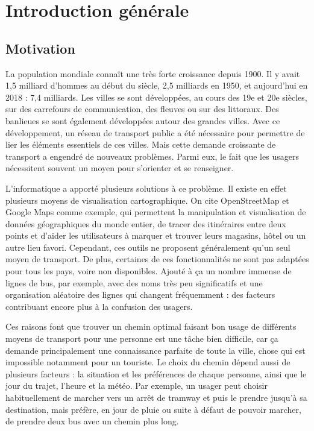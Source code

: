 \renewcommand\labelitemi{$\bullet$}
\renewcommand\labelitemii{$\circ$}
\chapter{Introduction générale}
\newpage	
\section{Motivation}
La population mondiale connaît une très forte croissance depuis 1900. Il y avait 1,5 milliard d’hommes au début du siècle, 2,5 milliards en 1950, et aujourd’hui en 2018 : 7,4 milliards. Les villes se sont développées, au cours des 19e et 20e siècles, sur des carrefours de communication, des fleuves ou sur des littoraux. Des banlieues se sont également développées autour des grandes villes. Avec ce développement, un réseau de transport public a été nécessaire pour permettre de lier les éléments essentiels de ces villes. Mais cette demande croissante de transport a engendré de nouveaux problèmes. Parmi eux, le fait que les usagers nécessitent souvent un moyen pour s’orienter et se renseigner.

L’informatique a apporté plusieurs solutions à ce problème. Il existe en effet plusieurs moyens de visualisation cartographique. On cite OpenStreetMap et Google Maps comme exemple, qui permettent la manipulation et visualisation de données géographiques du monde entier, de tracer des itinéraires entre deux points et d’aider les utilisateurs à marquer et trouver leurs magasins, hôtel ou un autre lieu favori. Cependant, ces outils ne proposent généralement qu’un seul moyen de transport. De plus, certaines de ces fonctionnalités ne sont pas adaptées pour tous les pays, voire non disponibles. Ajouté à ça un nombre immense de lignes de bus, par exemple, avec des noms très peu significatifs et une organisation aléatoire des lignes qui changent fréquemment : des facteurs contribuant encore plus à la confusion des usagers.

Ces raisons font que trouver un chemin optimal faisant bon usage de différents moyens de transport pour une personne est une tâche bien difficile, car ça demande principalement une connaissance parfaite de toute la ville, chose qui est impossible notamment pour un touriste.
Le choix du chemin dépend aussi de plusieurs facteurs : la situation et les préférences de chaque personne, ainsi que le jour du trajet, l'heure et la météo.
Par exemple, un usager peut choisir habituellement de marcher vers un arrêt de tramway et puis le prendre jusqu'à sa destination, mais préfère, en jour de pluie ou suite à défaut de pouvoir marcher, de prendre deux bus avec un chemin plus long.

